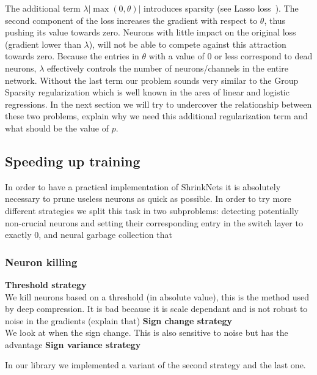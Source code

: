 The additional term $\lambda|\max(0, \theta)|$ introduces sparsity (see Lasso
loss~\cite{Tibshirani1996}). 
 The second component of the loss increases the gradient with respect to $\theta$, thus pushing its value towards zero. Neurons with little impact
on the original loss (gradient lower than $\lambda$), will not be able to
compete against this attraction towards zero. Because the entries in $\theta$
with a value of $0$ or less correspond to dead neurons, $\lambda$ effectively
controls the number of neurons/channels in the entire network. Without the last
term our problem sounds very similar to the Group Sparsity regularization which
is well known in the area of linear and logistic regressions. In the next
section we will try to undercover the relationship between these two problems,
explain why we need this additional regularization term and what should be the
value of $p$.



\subsection{Speeding up training}

In order to have a practical implementation of ShrinkNets it is absolutely
necessary to prune useless neurons as quick as possible. In order to try more
different strategies we split this task in two subproblems: detecting
potentially non-crucial neurons and setting their corresponding entry in the
switch layer to exactly 0, and neural garbage collection that 

\subsubsection{Neuron killing}
\textbf{Threshold strategy} \\ We kill neurons based on a threshold (in absolute
value), this is the method used by deep compression. It is bad because it is
scale dependant and is not robust to noise in the gradients (explain that)
\textbf{Sign change strategy} \\ We look at when the sign change. This is also
sensitive to noise but has the advantage
\textbf{Sign variance strategy}

In our library we implemented a variant of the second strategy and the last one.

